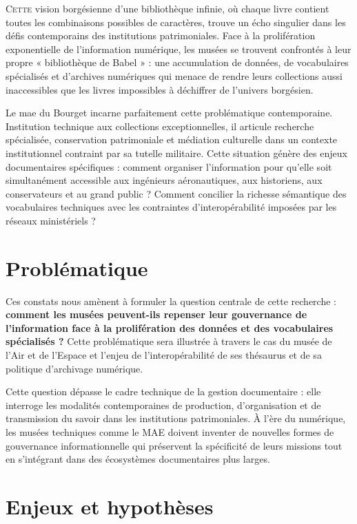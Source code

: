 
\lettrine{C}{ette} vision borgésienne d'une bibliothèque infinie, où chaque livre contient toutes les combinaisons possibles de caractères, trouve un écho singulier dans les défis contemporains des institutions patrimoniales. Face à la prolifération exponentielle de l'information numérique, les musées se trouvent confrontés à leur propre « bibliothèque de Babel » : une accumulation de données, de vocabulaires spécialisés et d'archives numériques qui menace de rendre leurs collections aussi inaccessibles que les livres impossibles à déchiffrer de l'univers borgésien.

Le \acf{mae} du Bourget incarne parfaitement cette problématique contemporaine. Institution technique aux collections exceptionnelles, il articule recherche spécialisée, conservation patrimoniale et médiation culturelle dans un contexte institutionnel contraint par sa tutelle militaire. Cette situation génère des enjeux documentaires spécifiques : comment organiser l'information pour qu'elle soit simultanément accessible aux ingénieurs aéronautiques, aux historiens, aux conservateurs et au grand public ? Comment concilier la richesse sémantique des vocabulaires techniques avec les contraintes d'interopérabilité imposées par les réseaux ministériels ?

\section*{Problématique}

Ces constats nous amènent à formuler la question centrale de cette recherche : \textbf{comment les musées peuvent-ils repenser leur gouvernance de l'information face à la prolifération des données et des vocabulaires spécialisés ?} Cette problématique sera illustrée à travers le cas du musée de l'Air et de l'Espace et l'enjeu de l'interopérabilité de ses thésaurus et de sa politique d'archivage numérique.

Cette question dépasse le cadre technique de la gestion documentaire : elle interroge les modalités contemporaines de production, d'organisation et de transmission du savoir dans les institutions patrimoniales. À l'ère du numérique, les musées techniques comme le MAE doivent inventer de nouvelles formes de gouvernance informationnelle qui préservent la spécificité de leurs missions tout en s'intégrant dans des écosystèmes documentaires plus larges.

\section*{Enjeux et hypothèses}

